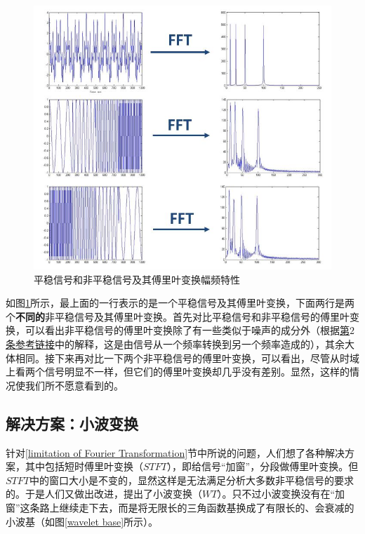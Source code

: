 \documentclass[UTF8]{ctexart}
\begin{document}
			\begin{figure}[H]
				\centering 
				\includegraphics[scale=0.6]{non-stationary.jpg} 
				\caption{平稳信号和非平稳信号及其傅里叶变换幅频特性} 
				\label{stationary and non-stationary}
			\end{figure}                
            
            \indent 如图\ref{stationary and non-stationary}所示，最上面的一行表示的是一个平稳信号及其傅里叶变换，下面两行是两个\textbf{不同的}非平稳信号及其傅里叶变换。首先对比平稳信号和非平稳信号的傅里叶变换，可以看出非平稳信号的傅里叶变换除了有一些类似于噪声的成分外（根据\href{http://users.rowan.edu/~polikar/WTpart1.html}{第$2$条参考链接}中的解释，这是由信号从一个频率转换到另一个频率造成的），其余大体相同。接下来再对比一下两个非平稳信号的傅里叶变换，可以看出，尽管从时域上看两个信号明显不一样，但它们的傅里叶变换却几乎没有差别。显然，这样的情况使我们所不愿意看到的。
            
        \subsection{解决方案：小波变换}
        
            \indent 针对\ref{limitation of Fourier Transformation}节中所说的问题，人们想了各种解决方案，其中包括短时傅里叶变换（$STFT$），即给信号“加窗”，分段做傅里叶变换。但$STFT$中的窗口大小是不变的，显然这样是无法满足分析大多数非平稳信号的要求的。于是人们又做出改进，提出了小波变换（$WT$）。只不过小波变换没有在“加窗”这条路上继续走下去，而是将无限长的三角函数基换成了有限长的、会衰减的小波基（如图\ref{wavelet base}所示）。
\end{document}
